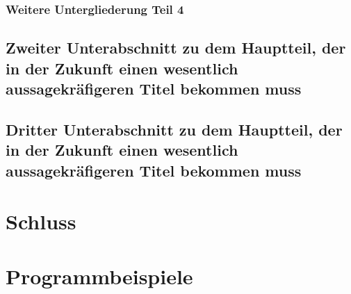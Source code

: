 \documentclass[ngerman]{scrbook}      %
\begin{document}
  \subsection{Weitere Untergliederung Teil 4}

  \section[Zweiter Unterabschnitt]{Zweiter Unterabschnitt zu
dem Hauptteil, der in der Zukunft einen wesentlich aussagekräfigeren
Titel bekommen muss}
  
  \section[Dritter Unterabschnitt]{Dritter Unterabschnitt zu
dem Hauptteil, der in der Zukunft einen wesentlich aussagekräfigeren
Titel bekommen muss}
  
  \chapter{Schluss}
  
  \appendix                     %
  
  \chapter{Programmbeispiele}
  
  \backmatter                   %
\end{document}
